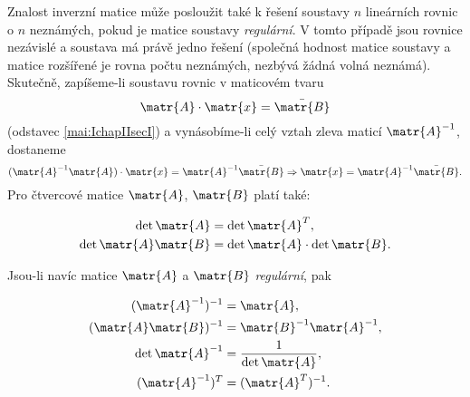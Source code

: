         
      Znalost inverzní matice může posloužit také k řešení soustavy \(n\) lineárních rovnic o \(n\)
      neznámých, pokud je matice soustavy \emph{regulární}. V tomto případě jsou rovnice nezávislé a
      soustava má právě jedno řešení (společná hodnost matice soustavy a matice rozšířené je rovna
      počtu neznámých, nezbývá žádná volná neznámá). Skutečně, zapíšeme-li soustavu rovnic v
      maticovém tvaru
      \begin{equation*}
        \matr{A}\cdot\matr{x} = \bar{\matr{B}}
      \end{equation*}
      (odstavec \ref{mai:IchapIIsecI}) a vynásobíme-li celý vztah zleva maticí \(\matr{A}^{-1}\),
      dostaneme
      \begin{equation*}
        (\matr{A}^{-1}\matr{A})\cdot \matr{x} = \matr{A}^{-1}\bar{\matr{B}} \Rightarrow 
        \matr{x} = \matr{A}^{-1}\bar{\matr{B}}.
      \end{equation*}
      Pro čtvercové matice \(\matr{A}\), \(\matr{B}\) platí také:
      \begin{mdframed}[style=highlight]
        \begin{subequations}\label{mai:eq81}
        \begin{align}
          \det{\matr{A}}         &= \det{\matr{A}^T},                         \\ 
          \det{\matr{A}\matr{B}} &= \det{\matr{A}}\cdot\det{\matr{B}}.  
        \end{align}
      \end{subequations}  
      \end{mdframed}
      Jsou-li navíc matice \(\matr{A}\) a \(\matr{B}\) \emph{regulární}, pak
      \begin{mdframed}[style=highlight]
        \begin{subequations}\label{mai:eq82}
          \begin{align}
            (\matr{A}^{-1})^{-1}     &= \matr{A},                             \\
            (\matr{A}\matr{B})^{-1}  &= \matr{B}^{-1}\matr{A}^{-1},           \\
            \det{\matr{A}^{-1}}      &= \frac{1}{\det{\matr{A}}},             \\
            (\matr{A}^{-1})^{T}      &= (\matr{A}^{T})^{-1}.
          \end{align}
        \end{subequations}  
      \end{mdframed}

